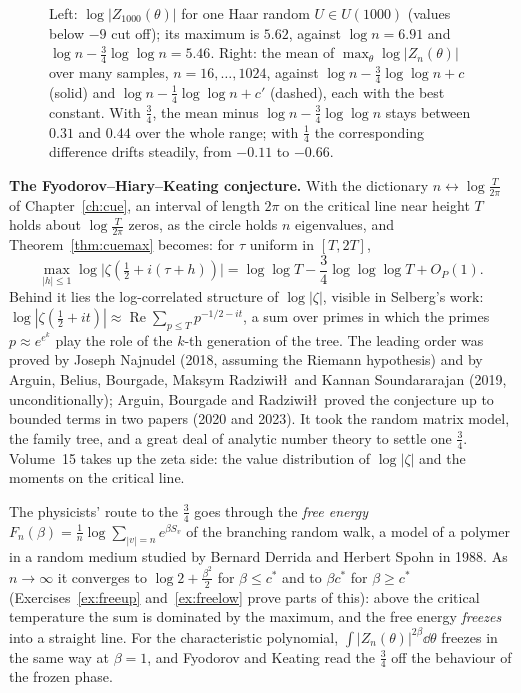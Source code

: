 \begin{figure}[ht]
\centering
{}
\caption{Left: $\log|Z_{1000}(\theta)|$ for one Haar random $U\in U(1000)$ (values below $-9$ cut off); its maximum is $5.62$, against $\log n=6.91$ and $\log n-\frac34\log\log n=5.46$. Right: the mean of $\max_\theta\log|Z_n(\theta)|$ over many
samples, $n=16,\dots,1024$, against $\log n-\frac34\log\log n+c$ (solid) and $\log n-\frac14\log\log n+c'$ (dashed), each with the best constant. With $\frac34$, the mean minus $\log n-\frac34\log\log n$ stays between $0.31$ and $0.44$ over the whole range; with $\frac14$ the corresponding difference drifts steadily, from $-0.11$ to $-0.66$.}
\label{fig:maxima}
\end{figure}

\begin{beauty}
\textbf{The Fyodorov--Hiary--Keating conjecture.} With the dictionary $n\leftrightarrow\log\frac T{2\pi}$ of Chapter~\ref{ch:cue}, an interval of length $2\pi$ on the critical line near height $T$ holds about $\log\frac T{2\pi}$ zeros, as the circle holds
$n$ eigenvalues, and Theorem~\ref{thm:cuemax} becomes: for $\tau$ uniform in $[T,2T]$,
\[
\max_{|h|\le1}\log\bigl|\zeta(\tfrac12+i(\tau+h))\bigr|=\log\log T-\frac34\log\log\log T+O_P(1).
\]
Behind it lies the log-correlated structure of $\log|\zeta|$, visible in Selberg's work: $\log|\zeta(\frac12+it)|\approx\operatorname{Re}\sum_{p\le T}p^{-1/2-it}$, a sum over primes in which the primes $p\approx e^{e^k}$ play the role of the $k$-th
generation of the tree. The leading order was proved by Joseph Najnudel (2018, assuming the Riemann hypothesis) and by Arguin, Belius, Bourgade, Maksym Radziwi\l\l\ and Kannan Soundararajan (2019, unconditionally); Arguin,
Bourgade and Radziwi\l\l\ proved the conjecture up to bounded terms in two papers (2020 and 2023). It took the random matrix model, the family tree, and a great deal of analytic number theory to settle one $\frac34$. Volume~15 takes up the zeta side: the value distribution of $\log|\zeta|$ and the moments on the critical line.
\end{beauty}

\begin{remark}[freezing]
The physicists' route to the $\frac34$ goes through the \emph{free energy} $F_n(\beta)=\frac1n\log\sum_{|v|=n}e^{\beta S_v}$ of the branching random walk, a model of a polymer in a random medium studied by Bernard Derrida and Herbert
Spohn in 1988. As $n\to\infty$ it converges to $\log2+\frac{\beta^2}2$ for $\beta\le c^*$ and to $\beta c^*$ for $\beta\ge c^*$ (Exercises~\ref{ex:freeup} and~\ref{ex:freelow} prove parts of this): above the critical temperature the sum is dominated by
the maximum, and the free energy \emph{freezes} into a straight line. For the characteristic polynomial, $\int|Z_n(\theta)|^{2\beta}\dd\theta$ freezes in the same way at $\beta=1$, and Fyodorov and Keating read the $\frac34$ off the
behaviour of the frozen phase.
\end{remark}

